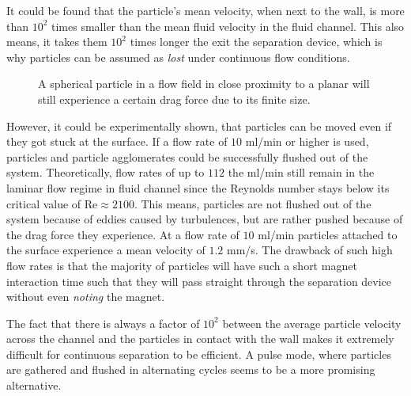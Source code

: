 It could be found that the particle's mean velocity, when next to the wall, is more than $10^{2}$ times smaller than the mean fluid velocity in the fluid channel. This also means, it takes them $10^{2}$ times longer the exit the separation device, which is why particles can be assumed as \textit{lost} under continuous flow conditions.

\begin{figure}[htb]
\centering
{}
\caption[Schematic of spherical particle in a flow field in proximity to a planar wall]{A spherical particle in a flow field in close proximity to a planar will still experience a certain drag force due to its finite size.}
\label{fig:particleStuckAtPlanarSurfaceVelocity}
\end{figure}

However, it could be experimentally shown, that particles can be moved even if they got stuck at the surface. If a flow rate of $10$ ml/min or higher is used, particles and particle agglomerates could be successfully flushed out of the system. Theoretically, flow rates of up to $112$ the ml/min still remain in the laminar flow regime in fluid channel since the Reynolds number stays below its critical value of $\text{Re} \approx 2100$. This means, particles are not flushed out of the system because of eddies caused by turbulences, but are rather pushed because of the drag force they experience. At a flow rate of $10$ ml/min particles attached to the surface experience a mean velocity of $1.2$ mm/s. The drawback of such high flow rates is that the majority of particles will have such a short magnet interaction time such that they will pass straight through the separation device without even \textit{noting} the magnet.

The fact that there is always a factor of $10^{2}$ between the average particle velocity across the channel and the particles in contact with the wall makes it extremely difficult for continuous separation to be efficient. A pulse mode, where particles are gathered and flushed in alternating cycles seems to be a more promising alternative. 

